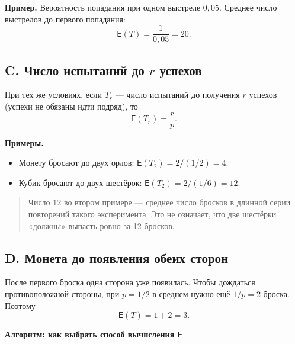 \documentclass[a4paper,12pt]{article}
\newcommand{\E}{\mathsf{E}}
\newcommand{\Key}[1]{\textbf{\color{darkaccent}#1}}
\newcommand{\smallnote}[1]{\begin{quote}\small\color{textgray}#1\end{quote}}
\begin{document}
\Key{Пример.} Вероятность попадания при одном выстреле $0{,}05$. Среднее число выстрелов до первого попадания:
\[
\E(T)=\frac{1}{0{,}05}=20.
\]

\subsection*{C. Число испытаний до $r$ успехов}
При тех же условиях, если $T_r$ --- число испытаний до получения $r$ успехов (успехи не обязаны идти подряд), то
\[
\boxed{\E(T_r)=\frac{r}{p}.}
\]

\Key{Примеры.}
\begin{itemize}
  \item Монету бросают до двух орлов: $\E(T_2)=2/(1/2)=4$.
  \item Кубик бросают до двух шестёрок: $\E(T_2)=2/(1/6)=12$.
\end{itemize}

\smallnote{Число $12$ во втором примере --- среднее число бросков в длинной серии повторений такого эксперимента. Это не означает, что две шестёрки «должны» выпасть ровно за 12 бросков.}

\subsection*{D. Монета до появления обеих сторон}
После первого броска одна сторона уже появилась. Чтобы дождаться противоположной стороны, при $p=1/2$ в среднем нужно ещё $1/p=2$ броска. Поэтому
\[
\boxed{\E(T)=1+2=3.}
\]
\endgroup

\clearpage

\thispagestyle{fancy}
\begin{center}
{\Large\bfseries\color{darkaccent}Алгоритм: как выбрать способ вычисления $\E$}
\end{center}
\vspace{0.6cm}

\end{document}
